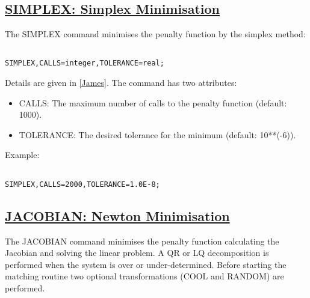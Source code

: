\begin{itemize}
\subsection{\href{simplex}{SIMPLEX: Simplex Minimisation}} The SIMPLEX command minimises the penalty function by the simplex method: 
\begin{verbatim}

SIMPLEX,CALLS=integer,TOLERANCE=real;
\end{verbatim} Details are given in \href{bibliography.html#minuit}{[James]}. The command has two attributes: 
\begin{itemize}
	\item CALLS: The maximum number of calls to the penalty function (default: 1000). 
	\item TOLERANCE: The desired tolerance for the minimum (default: 10**(-6)). 
\end{itemize} Example: 
\begin{verbatim}

SIMPLEX,CALLS=2000,TOLERANCE=1.0E-8;
\end{verbatim}

\subsection{\href{jacobian}{JACOBIAN: Newton Minimisation}} The JACOBIAN command minimises the penalty function calculating the Jacobian and solving the linear problem. A QR or LQ  decomposition is performed when the system is over or under-determined. Before starting the matching routine two optional transformations (COOL and RANDOM) are performed.     
\begin{verbatim}


\end{verbatim}
\end{itemize}

